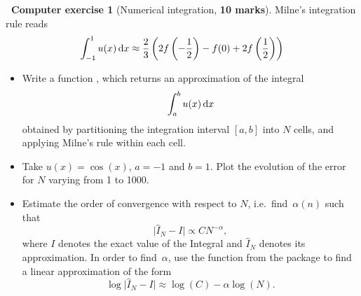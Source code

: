 \documentclass[11pt]{article}
\theoremstyle{definition}
\newtheorem{compexercise}{{\normalfont \faLaptop}~Computer exercise}
\renewcommand{\mymarks}[1]{\textbf{#1 marks}}
\begin{document}
\newpage
\begin{compexercise}
    [Numerical integration, \mymarks{10}]
    Milne's integration rule reads
    \[
        \int_{-1}^{1} u(x) \, \mathrm d x
        \approx \frac{2}{3} \left( 2 f\left(-\frac{1}{2}\right) - f(0) + 2 f\left(\frac{1}{2}\right) \right)
    \]
    \begin{itemize}

        \item
            Write a function ,
            which returns an approximation of the integral
            \[
                \int_{a}^{b} u(x) \, \mathrm d x
            \]
            obtained by partitioning the integration interval $[a, b]$ into $N$ cells,
            and applying Milne's rule within each cell.

        \item
            Take $u(x) = \cos(x)$, $a = -1$ and $b = 1$.
            Plot the evolution of the error for $N$ varying from 1 to 1000.

        \item
            Estimate the order of convergence with respect to $N$, i.e.\ find~$\alpha(n)$ such that
            \[
                \lvert \widehat I_{N} - I \rvert \propto C N^{-\alpha},
            \]
            where $I$ denotes the exact value of the Integral
            and $\widehat I_{N}$ denotes its approximation.
            In order to find~$\alpha$,
            use the function  from the  package to find a linear approximation
            of the form
            \[
                \log \lvert \widehat I_{N} - I \rvert \approx \log (C) - \alpha \log(N).
            \]
    \end{itemize}
\end{compexercise}
\end{document}

